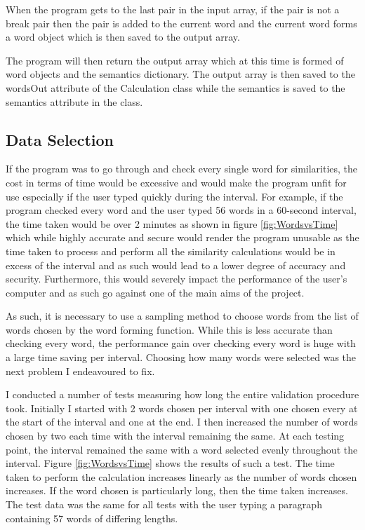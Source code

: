 \documentclass[10pt,a4paper]{report}
\begin{document}
When the program gets to the last pair in the input array, if the pair is not a break pair then the pair is added to the current word and the current word forms a word object which is then saved to the output array.

The program will then return the output array which at this time is formed of word objects and the semantics dictionary. The output array is then saved to the wordsOut attribute of the Calculation class while the semantics is saved to the semantics attribute in the class.

\subsection{Data Selection}

If the program was to go through and check every single word for similarities, the cost in terms of time would be excessive and would make the program unfit for use especially if the user typed quickly during the interval. For example, if the program checked every word and the user typed 56 words in a 60-second interval, the time taken would be over 2 minutes as shown in figure \ref{fig:WordsvsTime} which while highly accurate and secure would render the program unusable as the time taken to process and perform all the similarity calculations would be in excess of the interval and as such would lead to a lower degree of accuracy and security. Furthermore, this would severely impact the performance of the user's computer and as such go against one of the main aims of the project.

As such, it is necessary to use a sampling method to choose words from the list of words chosen by the word forming function. While this is less accurate than checking every word, the performance gain over checking every word is huge with a large time saving per interval. Choosing how many words were selected was the next problem I endeavoured to fix.

I conducted a number of tests measuring how long the entire validation procedure took. Initially I started with 2 words chosen per interval with one chosen every at the start of the interval and one at the end. I then increased the number of words chosen by two each time with the interval remaining the same. At each testing point, the interval remained the same with a word selected evenly throughout the interval. Figure \ref{fig:WordsvsTime} shows the results of such a test. The time taken to perform the calculation increases linearly as the number of words chosen increases. If the word chosen is particularly long, then the time taken increases. The test data was the same for all tests with the user typing a paragraph containing 57 words of differing lengths.
\end{document}
